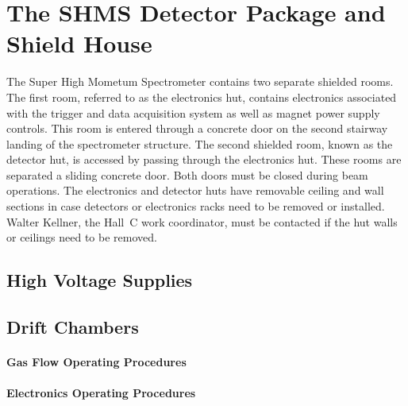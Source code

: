 
\section{The SHMS Detector Package and Shield House }

The Super High Mometum Spectrometer contains two separate shielded
rooms.  The first room, referred to as the electronics hut, contains
electronics associated with the trigger and data acquisition system as
well as magnet power supply controls.    This room is entered through a concrete
door on the second stairway landing of the spectrometer structure.
The second shielded room, known as the detector hut, is accessed by
passing through the electronics hut.  These rooms are separated a
sliding concrete door.  Both doors must be closed during beam
operations.  The electronics and detector huts have removable ceiling
and wall sections in case detectors or electronics racks need to be
removed or installed.  Walter Kellner, the Hall~C work coordinator,  
must be contacted if the hut walls or ceilings need to be removed.



\subsection{High Voltage Supplies}

\subsection{Drift Chambers}

\paragraph{Gas Flow Operating Procedures}

\paragraph{Electronics Operating Procedures}

